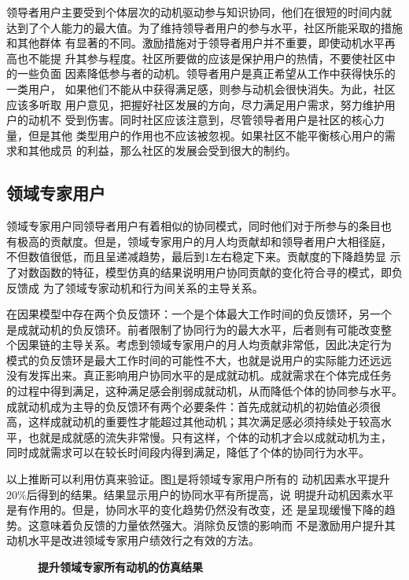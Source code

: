 领导者用户主要受到个体层次的动机驱动参与知识协同，他们在很短的时间内就
达到了个人能力的最大值。为了维持领导者用户的参与水平，社区所能采取的措施和其他群体
有显著的不同。激励措施对于领导者用户并不重要，即使动机水平再高也不能提
升其参与程度。社区所要做的应该是保护用户的热情，不要使社区中的一些负面
因素降低参与者的动机。领导者用户是真正希望从工作中获得快乐的一类用户，
如果他们不能从中获得满足感，则参与动机会很快消失。为此，社区应该多听取
用户意见，把握好社区发展的方向，尽力满足用户需求，努力维护用户的动机不
受到伤害。同时社区应该注意到，尽管领导者用户是社区的核心力量，但是其他
类型用户的作用也不应该被忽视。如果社区不能平衡核心用户的需求和其他成员
的利益，那么社区的发展会受到很大的制约。

\subsection{领域专家用户}
领域专家用户同领导者用户有着相似的协同模式，同时他们对于所参与的条目也
有极高的贡献度。但是，领域专家用户的月人均贡献却和领导者用户大相径庭，
不但数值很低，而且呈递减趋势，最后到1左右稳定下来。贡献度的下降趋势显
示了对数函数的特征，模型仿真的结果说明用户协同贡献的变化符合寻的模式，即负反馈成
为了领域专家动机和行为间关系的主导关系。

在因果模型中存在两个负反馈环：一个是个体最大工作时间的负反馈环，另一个
是成就动机的负反馈环。前者限制了协同行为的最大水平，后者则有可能改变整
个因果链的主导关系。考虑到领域专家用户的月人均贡献非常低，因此决定行为
模式的负反馈环是最大工作时间的可能性不大，也就是说用户的实际能力还远远
没有发挥出来。真正影响用户协同水平的是成就动机。成就需求在个体完成任务
的过程中得到满足，这种满足感会削弱成就动机，从而降低个体的协同参与水平。
成就动机成为主导的负反馈环有两个必要条件：首先成就动机的初始值必须很
高，这样成就动机的重要性才能超过其他动机；其次满足感必须持续处于较高水
平，也就是成就感的流失非常慢。只有这样，个体的动机才会以成就动机为主，
同时成就需求可以在较长时间段内得到满足，降低了个体的协同行为水平。 

以上推断可以利用仿真来验证。图\ref{fig:improve4}是将领域专家用户所有的
动机因素水平提升$20\%$后得到的结果。结果显示用户的协同水平有所提高，说
明提升动机因素水平是有作用的。但是，协同水平的变化趋势仍然没有改变，还
是呈现缓慢下降的趋势。这意味着负反馈的力量依然强大。消除负反馈的影响而
不是激励用户提升其动机水平是改进领域专家用户绩效行之有效的方法。
\begin{figure}[!htb]
  \centering
  \caption{\small{\textbf{提升领域专家所有动机的仿真结果}}}
  \label{fig:improve4}
\end{figure}

